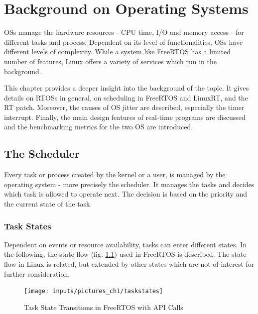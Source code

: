 \chapter{Background on Operating Systems}\label{ch_background}
\acp{OS} manage the hardware resources - \ac{CPU} time, \ac{I/O} and memory access  - for different tasks and process. 
Dependent on its level of functionalities, \acp{OS} have different levels of complexity.
While a system like FreeRTOS has a limited number of features, Linux offers a variety of services which run in the background. 
\par

This chapter provides a deeper insight into the background of the topic. 
It gives details on \acp{RTOS} in general, on scheduling in FreeRTOS and LinuxRT, and the RT patch. 
Moreover, the causes of \ac{OS} jitter are described, especially the timer interrupt. 
Finally, the main design features of real-time programs are discussed and the benchmarking metrics for the two \ac{OS} are introduced. 

\section{The Scheduler}\label{s_scheduler}
Every task or process created by the kernel or a user, is managed by the operating system - more precisely the scheduler. 
It manages the tasks and decides which task is allowed to operate next. 
The decision is based on the priority and the current state of the task. 

\subsection{Task States}\label{ss_task_states}
Dependent on events or resource availability, tasks can enter different states. 
In the following, the state flow (fig. \ref{fig_taskstates}) used in FreeRTOS \cite{freertos} is described. 
The state flow in Linux is related, but extended by other states which are not of interest for further consideration. 

\begin{figure}[htb]
	\begin{center}
		\texttt{[image: inputs/pictures\_ch1/taskstates]}
	\end{center}
	\caption[Task State Transitions in FreeRTOS]{Task State Transitions in FreeRTOS with API Calls \cite{freertos}} \label{fig_taskstates}
\end{figure}

